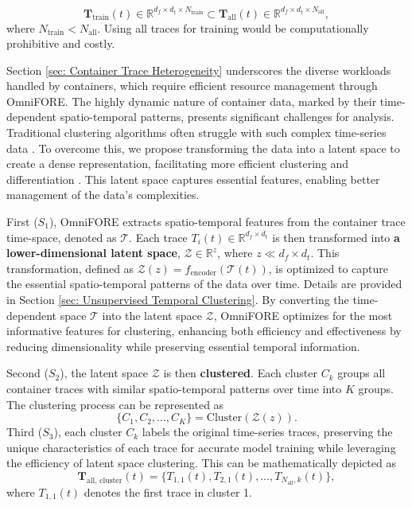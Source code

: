 \begin{equation}
\mathbf{T}_{\text{train}}(t) \in \mathbb{R}^{d_f \times d_t \times N_{\text{train}}} \subset \mathbf{T}_{\text{all}}(t) \in \mathbb{R}^{d_f \times d_t \times N_{\text{all}}},
\end{equation}
where $N_{\text{train}} < N_{\text{all}}$. Using all traces for training would be computationally prohibitive and costly.

Section \ref{sec: Container Trace Heterogeneity} underscores the diverse workloads handled by containers, which require efficient resource management through OmniFORE. The highly dynamic nature of container data, marked by their time-dependent spatio-temporal patterns, presents significant challenges for analysis. Traditional clustering algorithms often struggle with such complex time-series data \cite{gupta2020approaches}. To overcome this, we propose transforming the data into a latent space to create a dense representation, facilitating more efficient clustering and differentiation \cite{frazier2018tutorial}. This latent space captures essential features, enabling better management of the data's complexities.

First ($S_1$), OmniFORE extracts spatio-temporal features from the container trace time-space, denoted as $\mathcal{T}$. Each trace $T_i(t) \in \mathbb{R}^{d_f \times d_{\text{t}}}$ is then transformed into \textbf{a lower-dimensional latent space}, $\mathcal{Z} \in \mathbb{R}^{z}$, where $z \ll d_f \times d_t$. This transformation, defined as $\mathcal{Z}(z) = f_{\text{encoder}}(\mathcal{T}(t))$, is optimized to capture the essential spatio-temporal patterns of the data over time. Details are provided in Section \ref{sec: Unsupervised Temporal Clustering}. By converting the time-dependent space $\mathcal{T}$ into the latent space $\mathcal{Z}$, OmniFORE optimizes for the most informative features for clustering, enhancing both efficiency and effectiveness by reducing dimensionality while preserving essential temporal information.

Second ($S_2$), the latent space $\mathcal{Z}$ is then \textbf{clustered}. Each cluster $C_k$ groups all container traces with similar spatio-temporal patterns over time into $K$ groups. The clustering process can be represented as
\begin{equation}   
\{C_1, C_2, \ldots, C_K\} = \text{Cluster}(\mathcal{Z}(z)).
\end{equation}
Third ($S_3$), each cluster \(C_k\) labels the original time-series traces, preserving the unique characteristics of each trace for accurate model training while leveraging the efficiency of latent space clustering. This can be mathematically depicted as
\begin{equation}
\mathbf{T}_{\text{all, cluster}}(t) = \{T_{1,1}(t), T_{2,1}(t), \ldots, T_{N_\text{all},k}(t)\},
\end{equation}
where $T_{1,1}(t)$ denotes the first trace in cluster 1.

